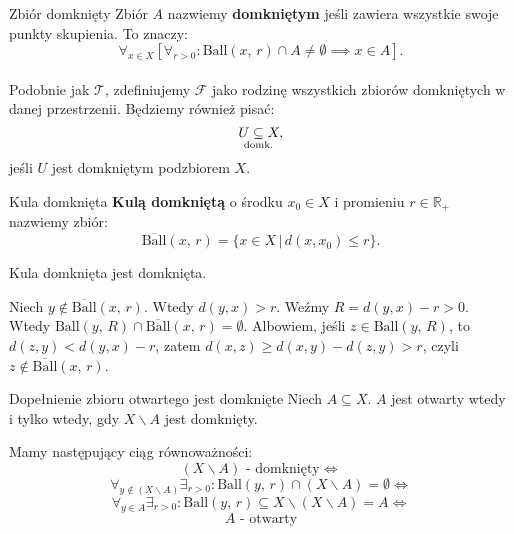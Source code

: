 \documentclass{article}
\newcounter{defi}
\numberwithin{defi}{section}
\numberwithin{defi}{section}
\newcommand{\R}{\mathbb{R}}
\newcommand{\Tau}{\mathcal{T}}
\newcommand{\Fau}{\mathcal{F}}
\newcommand{\subdomk}{\underset{\clap{\scriptsize domk.}}{\subseteq}}
\newcommand{\ball}[2]{\text{Ball}(#1, \, #2)}
\newcommand{\dball}[2]{\overline{\text{Ball}}(#1, \, #2)}
\begin{document}
\begin{defr}{Zbiór domknięty}
    Zbiór $A$ nazwiemy \textbf{domkniętym} jeśli zawiera wszystkie swoje punkty skupienia. To znaczy: \begin{equation}
        \forall_{x \in X} [\forall_{r>0}: \ball{x}{r} \cap A \neq \emptyset \implies x \in A].
    \end{equation}
    \\
    Podobnie jak $\Tau$, zdefiniujemy $\Fau$ jako rodzinę wszystkich zbiorów domkniętych w danej przestrzenii. Będziemy również pisać:
    \begin{equation}
        U \subdomk X,
    \end{equation}
    jeśli $U$ jest domkniętym podzbiorem $X$.
\end{defr}

\begin{defr}{Kula domknięta}
    \textbf{Kulą domkniętą} o środku $x_0 \in X$ i promieniu $r \in \R_+$ nazwiemy zbiór: \begin{equation}
        \dball{x}{r} = \{ x\in X \, | \, d(x, x_0) \leqslant r\}.
    \end{equation}
\end{defr}

\begin{twier}{}
    Kula domknięta jest domknięta.
\end{twier}

\begin{dow}
    Niech $y \notin \dball{x}{r}$. Wtedy $d(y, x) > r$. Weźmy $R = d(y, x) - r > 0$. Wtedy $\ball{y}{R} \cap \dball{x}{r} = \emptyset$. Albowiem, jeśli $z \in \ball{y}{R}$, to $d(z, y) <  d(y, x) - r $, zatem $d(x, z) \geqslant d(x, y) - d(z, y)  > r$, czyli $z \notin \dball{x}{r}$.
\end{dow}

\begin{twier}{Dopełnienie zbioru otwartego jest domknięte}\label{twier:dopelnienie-otwartego}
    Niech $A \subseteq X$. $A$ jest otwarty wtedy i tylko wtedy, gdy $X \backslash A$ jest domknięty.
\end{twier}



\begin{dow}
    Mamy następujący ciąg równoważności:
    \begin{equation}
        (X \backslash A) \text{ - domknięty} \iff
    \end{equation}
    \begin{equation}
        \forall_{y \notin (X \backslash A)} \exists_{r > 0}: \ball{y}{r} \cap (X \backslash A) =  \emptyset \iff
    \end{equation}
    \begin{equation}
        \forall_{y \in A} \exists_{r > 0}: \ball{y}{r} \subseteq X \backslash (X \backslash A) = A \iff
    \end{equation}
    \begin{equation}
        A \text{ - otwarty}
    \end{equation}
\end{dow}
\end{document}
